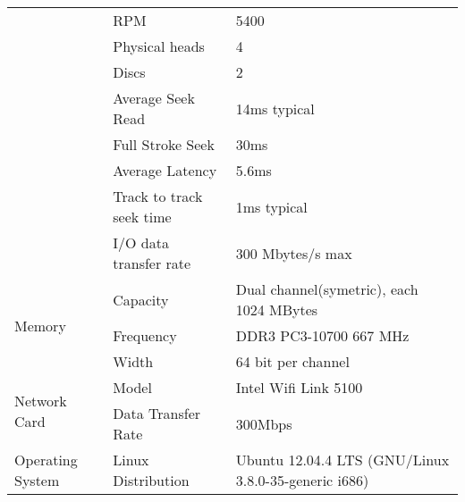 \documentclass{article}
\begin{document}
\begin{table}[h]
\begin{tabular}{|l|l|l|}
                                        & RPM                      & 5400                                                           \\ \cline{2-3}
                                        & Physical heads           & 4                                                              \\ \cline{2-3}
                                        & Discs                    & 2                                                              \\ \cline{2-3}
                                        & Average Seek Read        & 14ms typical                                                   \\ \cline{2-3}
                                        & Full Stroke Seek         & 30ms                                                           \\ \cline{2-3}
                                        & Average Latency          & 5.6ms                                                          \\ \cline{2-3}
                                        & Track to track seek time & 1ms typical                                                    \\ \cline{2-3}
                                        & I/O data transfer rate   & 300 Mbytes/s max                                               \\ \cline{2-3}
    \hline
    \multirow{3}{*}{Memory}             & Capacity                 & Dual channel(symetric), each 1024 MBytes                       \\ \cline{2-3}
                                        & Frequency                & DDR3 PC3-10700 667 MHz                                         \\ \cline{2-3}
                                        & Width                    & 64 bit per channel                                             \\ \cline{2-3}
    \hline
    \multirow{2}{*}{Network Card}       & Model                    & Intel Wifi Link 5100                                           \\ \cline{2-3}
                                        & Data Transfer Rate       & 300Mbps                                                        \\ \cline{2-3}
    \hline
    \multirow{1}{*}{Operating System}   & Linux Distribution       & Ubuntu 12.04.4 LTS (GNU/Linux 3.8.0-35-generic i686)           \\ \cline{2-3}
    \hline
  \end{tabular}
\end{table}
\end{document}
